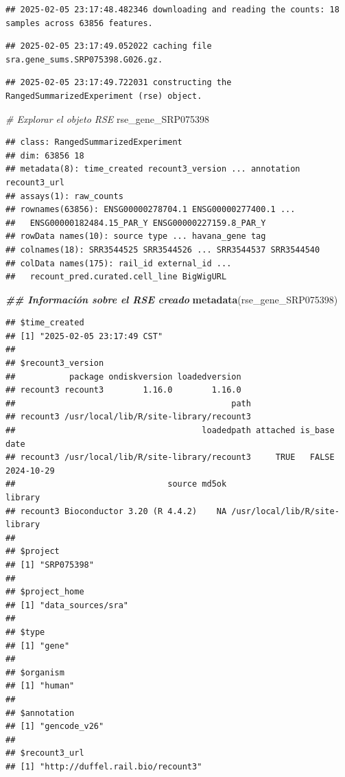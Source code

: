 \documentclass[
]{article}
\newenvironment{Shaded}{\begin{snugshade}}{\end{snugshade}}
\newcommand{\CommentTok}[1]{\textcolor[rgb]{0.56,0.35,0.01}{\textit{#1}}}
\newcommand{\DocumentationTok}[1]{\textcolor[rgb]{0.56,0.35,0.01}{\textbf{\textit{#1}}}}
\newcommand{\FunctionTok}[1]{\textcolor[rgb]{0.13,0.29,0.53}{\textbf{#1}}}
\newcommand{\NormalTok}[1]{#1}
\begin{document}
\begin{verbatim}
## 2025-02-05 23:17:48.482346 downloading and reading the counts: 18 samples across 63856 features.
\end{verbatim}

\begin{verbatim}
## 2025-02-05 23:17:49.052022 caching file sra.gene_sums.SRP075398.G026.gz.
\end{verbatim}

\begin{verbatim}
## 2025-02-05 23:17:49.722031 constructing the RangedSummarizedExperiment (rse) object.
\end{verbatim}

\begin{Shaded}
\begin{Highlighting}[]
\CommentTok{\# Explorar el objeto RSE}
\NormalTok{rse\_gene\_SRP075398}
\end{Highlighting}
\end{Shaded}

\begin{verbatim}
## class: RangedSummarizedExperiment 
## dim: 63856 18 
## metadata(8): time_created recount3_version ... annotation recount3_url
## assays(1): raw_counts
## rownames(63856): ENSG00000278704.1 ENSG00000277400.1 ...
##   ENSG00000182484.15_PAR_Y ENSG00000227159.8_PAR_Y
## rowData names(10): source type ... havana_gene tag
## colnames(18): SRR3544525 SRR3544526 ... SRR3544537 SRR3544540
## colData names(175): rail_id external_id ...
##   recount_pred.curated.cell_line BigWigURL
\end{verbatim}

\begin{Shaded}
\begin{Highlighting}[]
\DocumentationTok{\#\# Información sobre el RSE creado}
\FunctionTok{metadata}\NormalTok{(rse\_gene\_SRP075398)}
\end{Highlighting}
\end{Shaded}

\begin{verbatim}
## $time_created
## [1] "2025-02-05 23:17:49 CST"
## 
## $recount3_version
##           package ondiskversion loadedversion
## recount3 recount3        1.16.0        1.16.0
##                                            path
## recount3 /usr/local/lib/R/site-library/recount3
##                                      loadedpath attached is_base       date
## recount3 /usr/local/lib/R/site-library/recount3     TRUE   FALSE 2024-10-29
##                               source md5ok                       library
## recount3 Bioconductor 3.20 (R 4.4.2)    NA /usr/local/lib/R/site-library
## 
## $project
## [1] "SRP075398"
## 
## $project_home
## [1] "data_sources/sra"
## 
## $type
## [1] "gene"
## 
## $organism
## [1] "human"
## 
## $annotation
## [1] "gencode_v26"
## 
## $recount3_url
## [1] "http://duffel.rail.bio/recount3"
\end{verbatim}
\end{document}
